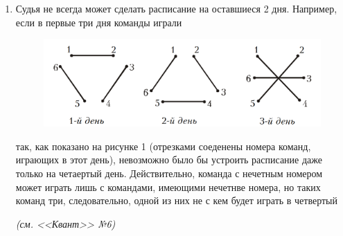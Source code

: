 \begin{enumerate}[itemsep = -3pt, itemindent = -7pt, labelsep = 5pt, font = \bfseries, topsep = 3pt, wide]
    \item Судья не всегда может сделать расписание на оставшиеся 2 дня. Например, если в первые три дня команды играли 
       \vspace{-0.75cm}
   \begin{figure}[h]
   \centering
       \includegraphics[scale = 0.18]{Матчи.png}
       \captionsetup{justification=raggedright,
singlelinecheck=false}
       \caption{}
   \end{figure}
   \vspace{-0.5cm}
    так, как показано на рисунке 1 (отрезками соеденены номера команд, играющих в этот день), невозможно было бы устроить расписание даже только на четаертый день. Действительно, команда с нечетным номером может играть лишь с командами, имеющими нечетнве номера, но таких команд три, следовательно, одной из них не с кем будет играть в четвертый
    \medskip
    
    {\it (см. <<Квант>> №6)}
\end{enumerate}


